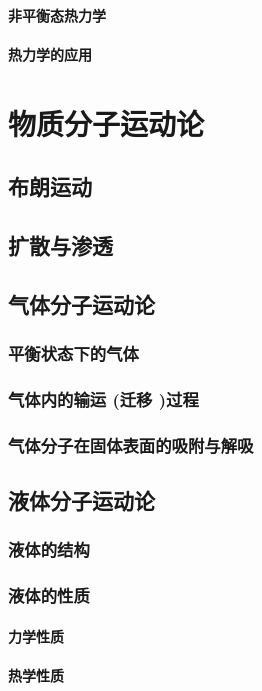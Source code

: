 \documentclass[UTF8]{../06-Physics}
\begin{document}
    \subsubsection{非平衡态热力学}
    \subsubsection{热力学的应用}



\chapter{物质分子运动论}
\section{布朗运动}
\section{扩散与渗透}
\section{气体分子运动论}
    \subsection{平衡状态下的气体}
    \subsection{气体内的输运 (迁移 )过程}
    \subsection{气体分子在固体表面的吸附与解吸}
\section{液体分子运动论}
    \subsection{液体的结构}
    \subsection{液体的性质}
        \subsubsection{力学性质}
        \subsubsection{热学性质}
\end{document}
